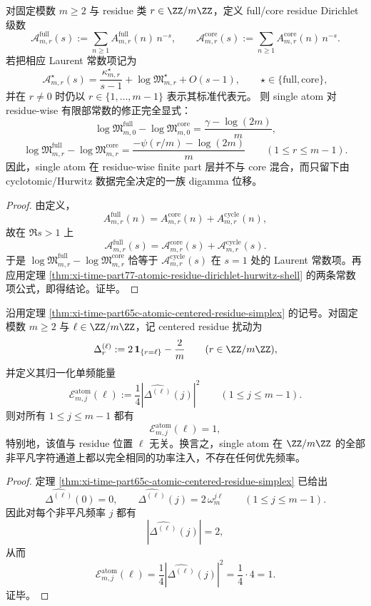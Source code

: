 \begin{corollary}\label{cor:xi-time-part77-atomic-residue-finitepart-digamma-shift}
对固定模数 \(m\ge 2\) 与 residue 类 \(r\in \ZZ/m\ZZ\)，定义 full/core residue Dirichlet 级数
\[
\mathcal A^{\mathrm{full}}_{m,r}(s)
:=
\sum_{n\ge 1}A^{\mathrm{full}}_{m,r}(n)\,n^{-s},
\qquad
\mathcal A^{\mathrm{core}}_{m,r}(s)
:=
\sum_{n\ge 1}A^{\mathrm{core}}_{m,r}(n)\,n^{-s}.
\]
若把相应 Laurent 常数项记为
\[
\mathcal A^{\star}_{m,r}(s)
=
\frac{\kappa^{\star}_{m,r}}{s-1}
+\log\mathfrak M^{\star}_{m,r}
+O(s-1),
\qquad
\star\in\{\mathrm{full},\mathrm{core}\},
\]
并在 \(r\neq 0\) 时仍以 \(r\in\{1,\dots,m-1\}\) 表示其标准代表元。
则 single atom 对 residue-wise 有限部常数的修正完全显式：
\[
\log\mathfrak M^{\mathrm{full}}_{m,0}
-\log\mathfrak M^{\mathrm{core}}_{m,0}
=
\frac{\gamma-\log(2m)}{m},
\]
\[
\log\mathfrak M^{\mathrm{full}}_{m,r}
-\log\mathfrak M^{\mathrm{core}}_{m,r}
=
\frac{-\psi(r/m)-\log(2m)}{m}
\qquad (1\le r\le m-1).
\]
因此，single atom 在 residue-wise finite part 层并不与 core 混合，而只留下由 cyclotomic/Hurwitz 数据完全决定的一族 digamma 位移。
\end{corollary}
\begin{proof}
由定义，
\[
A^{\mathrm{full}}_{m,r}(n)=A^{\mathrm{core}}_{m,r}(n)+A^{\mathrm{cycle}}_{m,r}(n),
\]
故在 \(\Re s>1\) 上
\[
\mathcal A^{\mathrm{full}}_{m,r}(s)
=
\mathcal A^{\mathrm{core}}_{m,r}(s)+\mathcal A^{\mathrm{cycle}}_{m,r}(s).
\]
于是 \(\log\mathfrak M^{\mathrm{full}}_{m,r}-\log\mathfrak M^{\mathrm{core}}_{m,r}\) 恰等于 \(\mathcal A^{\mathrm{cycle}}_{m,r}(s)\) 在 \(s=1\) 处的 Laurent 常数项。再应用定理 \ref{thm:xi-time-part77-atomic-residue-dirichlet-hurwitz-shell} 的两条常数项公式，即得结论。证毕。
\end{proof}

\begin{corollary}\label{cor:xi-time-part77-atomic-centered-residue-equipower}
沿用定理 \ref{thm:xi-time-part65c-atomic-centered-residue-simplex} 的记号。对固定模数 \(m\ge 2\) 与 \(\ell\in \ZZ/m\ZZ\)，记 centered residue 扰动为
\[
\Delta^{(\ell)}_r:=2\,\mathbf 1_{\{r=\ell\}}-\frac{2}{m}
\qquad (r\in \ZZ/m\ZZ),
\]
并定义其归一化单频能量
\[
\mathcal E^{\mathrm{atom}}_{m,j}(\ell)
:=
\frac{1}{4}\left|\widehat{\Delta^{(\ell)}}(j)\right|^2
\qquad (1\le j\le m-1).
\]
则对所有 \(1\le j\le m-1\) 都有
\[
\mathcal E^{\mathrm{atom}}_{m,j}(\ell)=1,
\]
特别地，该值与 residue 位置 \(\ell\) 无关。换言之，single atom 在 \(\ZZ/m\ZZ\) 的全部非平凡字符通道上都以完全相同的功率注入，不存在任何优先频率。
\end{corollary}
\begin{proof}
定理 \ref{thm:xi-time-part65c-atomic-centered-residue-simplex} 已给出
\[
\widehat{\Delta^{(\ell)}}(0)=0,
\qquad
\widehat{\Delta^{(\ell)}}(j)=2\,\omega_m^{j\ell}
\qquad (1\le j\le m-1).
\]
因此对每个非平凡频率 \(j\) 都有
\[
\left|\widehat{\Delta^{(\ell)}}(j)\right|=2,
\]
从而
\[
\mathcal E^{\mathrm{atom}}_{m,j}(\ell)
=
\frac14\left|\widehat{\Delta^{(\ell)}}(j)\right|^2
=
\frac14\cdot 4
=
1.
\]
证毕。
\end{proof}

